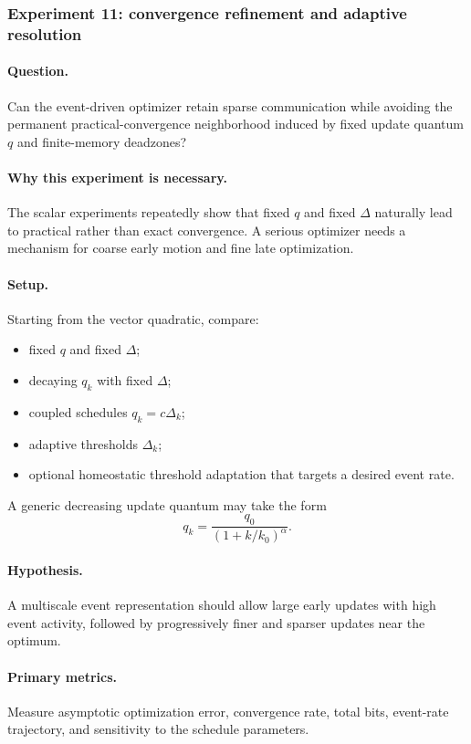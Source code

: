 \subsubsection{Experiment 11: convergence refinement and adaptive resolution}

\paragraph{Question.}
Can the event-driven optimizer retain sparse communication while avoiding the permanent practical-convergence neighborhood induced by fixed update quantum $q$ and finite-memory deadzones?

\paragraph{Why this experiment is necessary.}
The scalar experiments repeatedly show that fixed $q$ and fixed $\Delta$ naturally lead to practical rather than exact convergence. A serious optimizer needs a mechanism for coarse early motion and fine late optimization.

\paragraph{Setup.}
Starting from the vector quadratic, compare:
\begin{itemize}
  \item fixed $q$ and fixed $\Delta$;
  \item decaying $q_k$ with fixed $\Delta$;
  \item coupled schedules $q_k=c\Delta_k$;
  \item adaptive thresholds $\Delta_k$;
  \item optional homeostatic threshold adaptation that targets a desired event rate.
\end{itemize}
A generic decreasing update quantum may take the form
\begin{equation}
  q_k=\frac{q_0}{(1+k/k_0)^\alpha}.
\end{equation}

\paragraph{Hypothesis.}
A multiscale event representation should allow large early updates with high event activity, followed by progressively finer and sparser updates near the optimum.

\paragraph{Primary metrics.}
Measure asymptotic optimization error, convergence rate, total bits, event-rate trajectory, and sensitivity to the schedule parameters.

